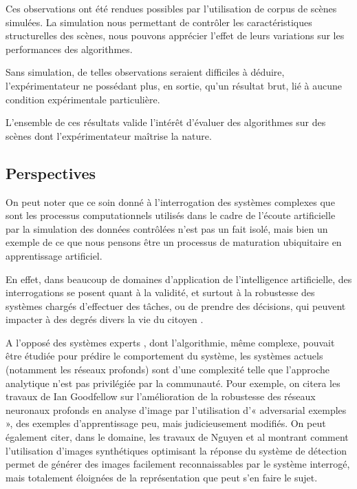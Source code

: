 Ces observations ont été rendues possibles par l'utilisation de corpus de scènes simulées. La simulation nous permettant de contrôler les caractéristiques structurelles des scènes, nous pouvons apprécier l’effet de leurs variations sur les performances des algorithmes.

Sans simulation, de telles observations seraient difficiles à déduire, l’expérimentateur ne possédant plus, en sortie, qu’un résultat brut, lié à aucune condition expérimentale particulière.

L'ensemble de ces résultats valide l'intérêt d'évaluer des algorithmes sur des scènes dont l'expérimentateur maîtrise la nature.

\subsection{Perspectives}

On peut noter que ce soin donné à l'interrogation des systèmes complexes que sont les processus computationnels utilisés dans le cadre de l’écoute artificielle par la simulation des données contrôlées n’est pas un fait isolé, mais bien un exemple de ce que nous pensons être un processus de maturation ubiquitaire en apprentissage artificiel.

En effet, dans beaucoup de domaines d’application de l’intelligence artificielle, des interrogations se posent quant à la validité, et surtout à la robustesse des systèmes chargés d’effectuer des tâches, ou de prendre des décisions, qui peuvent impacter à des degrés divers la vie du citoyen \citep{o2016weapons}.

A l'opposé des systèmes experts \citep{Leondes2002xxiii}, dont l'algorithmie, même complexe, pouvait être étudiée pour prédire le comportement du système, les systèmes actuels (notamment les réseaux profonds) sont d’une complexité telle que l'approche analytique  n'est pas privilégiée par la communauté. Pour exemple, on citera les travaux de Ian Goodfellow sur l'amélioration de la robustesse des réseaux neuronaux profonds en analyse d'image par l'utilisation d'« adversarial exemples », des exemples d'apprentissage peu, mais judicieusement modifiés. On peut également citer, dans le domaine, les travaux de Nguyen et al montrant comment l'utilisation d'images synthétiques optimisant la réponse du système de détection permet de générer des images facilement reconnaissables par le système interrogé, mais totalement éloignées de la représentation que peut s'en faire le sujet.

